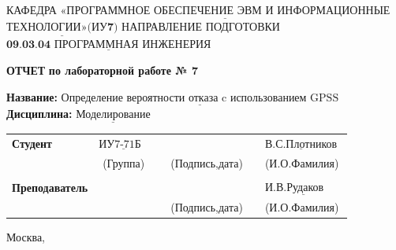 \documentclass[12pt,a4paper,oneside]{report}
\begin{document}
\noindent КАФЕДРА $\underline{\textbf{«ПРОГРАММНОЕ ОБЕСПЕЧЕНИЕ ЭВМ И ИНФОРМАЦИОННЫЕ}}$\newline\newline $\underline{\textbf{ТЕХНОЛОГИИ»(ИУ7)}}$\newline\newline
\noindent НАПРАВЛЕНИЕ ПОДГОТОВКИ $\underline{\textbf{09.03.04 ПРОГРАММНАЯ ИНЖЕНЕРИЯ}}$\newline\newline\newline\newline\newline\newline\newline
\begin{center}
    \begin{flushright}
    \Large\textbf{ОТЧЕТ}\newline
	\Large\textbf{по лабораторной работе № 7}\newline
	\end{flushright}
\end{center}
\noindent\textbf{Название:} $\underline{\text{Определение вероятности отказа c использованием GPSS}}$\newline\newline
\noindent\textbf{Дисциплина:} $\underline{\text{Моделирование}}$\newline\newline\newline\newline\newline\newline\newline\newline
\begin{tabular}{lcp{5em}lp{2em}l}
	\noindent\textbf{Студент} &  $\underline{\text{ИУ7-71Б~~}}$ &             &\hspace{1cm} & & $\underline{\text{В.С.Плотников}}$ \\\cline{4-3}
	 & (Группа) & &(Подпись,дата)  & & (И.О.Фамилия) \\
	 & & & & &\\
	\noindent\textbf{Преподаватель} &  & &\hspace{1cm} & &$\underline{\text{И.В.Рудаков ~~~~}}$ \\\cline{4-3} 
	 &  & & (Подпись,дата)  & &(И.О.Фамилия) \\
    \end{tabular}
\begin{center}
	\vfill
	Москва, \the\year
\end{center}
\clearpage
\end{document}
